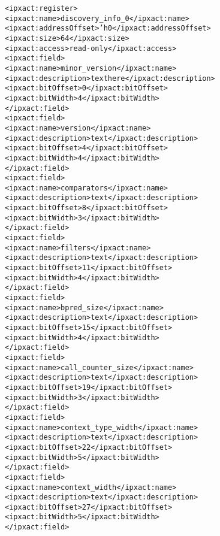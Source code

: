 \begin{alltt}
            <ipxact:register>
               <ipxact:name>discovery_info_0</ipxact:name>
               <ipxact:addressOffset>'h0</ipxact:addressOffset>
               <ipxact:size>64</ipxact:size>
               <ipxact:access>read-only</ipxact:access>
               <ipxact:field>
                  <ipxact:name>minor_version</ipxact:name>
                  <ipxact:description>text here</ipxact:description>
                  <ipxact:bitOffset>0</ipxact:bitOffset>
                  <ipxact:bitWidth>4</ipxact:bitWidth>
               </ipxact:field>
               <ipxact:field>
                  <ipxact:name>version</ipxact:name>
                  <ipxact:description>text</ipxact:description>
                  <ipxact:bitOffset>4</ipxact:bitOffset>
                  <ipxact:bitWidth>4</ipxact:bitWidth>
               </ipxact:field>
               <ipxact:field>
                  <ipxact:name>comparators</ipxact:name>
                  <ipxact:description>text</ipxact:description>
                  <ipxact:bitOffset>8</ipxact:bitOffset>
                  <ipxact:bitWidth>3</ipxact:bitWidth>
               </ipxact:field>
               <ipxact:field>
                  <ipxact:name>filters</ipxact:name>
                  <ipxact:description>text</ipxact:description>
                  <ipxact:bitOffset>11</ipxact:bitOffset>
                  <ipxact:bitWidth>4</ipxact:bitWidth>
               </ipxact:field>
               <ipxact:field>
                  <ipxact:name>bpred_size</ipxact:name>
                  <ipxact:description>text</ipxact:description>
                  <ipxact:bitOffset>15</ipxact:bitOffset>
                  <ipxact:bitWidth>4</ipxact:bitWidth>
               </ipxact:field>
               <ipxact:field>
                  <ipxact:name>call_counter_size</ipxact:name>
                  <ipxact:description>text</ipxact:description>
                  <ipxact:bitOffset>19</ipxact:bitOffset>
                  <ipxact:bitWidth>3</ipxact:bitWidth>
               </ipxact:field>
               <ipxact:field>
                  <ipxact:name>context_type_width</ipxact:name>
                  <ipxact:description>text</ipxact:description>
                  <ipxact:bitOffset>22</ipxact:bitOffset>
                  <ipxact:bitWidth>5</ipxact:bitWidth>
               </ipxact:field>
               <ipxact:field>
                  <ipxact:name>context_width</ipxact:name>
                  <ipxact:description>text</ipxact:description>
                  <ipxact:bitOffset>27</ipxact:bitOffset>
                  <ipxact:bitWidth>5</ipxact:bitWidth>
               </ipxact:field>

\end{alltt}
